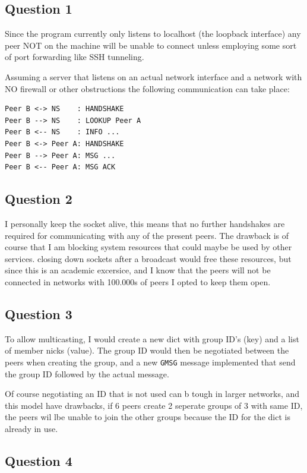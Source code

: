 \documentclass[10pt]{article}
\begin{document}
\subsection{Question 1}
Since the program currently only listens to localhost (the loopback interface)
any peer NOT on the machine will be unable to connect unless employing some sort
of port forwarding like SSH tunneling.

Assuming a server that listens on an actual network interface and a network with
NO firewall or other obstructions the following communication can take place:
\begin{verbatim}
Peer B <-> NS    : HANDSHAKE
Peer B --> NS    : LOOKUP Peer A
Peer B <-- NS    : INFO ...
Peer B <-> Peer A: HANDSHAKE
Peer B --> Peer A: MSG ...
Peer B <-- Peer A: MSG ACK
\end{verbatim}

\subsection{Question 2}
I personally keep the socket alive, this means that no further handshakes are
required for communicating with any of the present peers. The drawback is of
course that I am blocking system resources that could maybe be used by other
services. closing down sockets after a broadcast would free these resources, but
since this is an academic excersice, and I know that the peers will not be
connected in networks with 100.000s of peers I opted to keep them open.

\subsection{Question 3}
To allow multicasting, I would create a new dict with group ID's (key) and a
list of member nicks (value). The group ID would then be negotiated between the
peers when creating the group, and a new \texttt{GMSG} message implemented that
send the group ID followed by the actual message.

Of course negotiating an ID that is not used can b tough in larger networks, and
this model have drawbacks, if 6 peers create 2 seperate groups of 3 with same
ID, the peers wil lbe unable to join the other groups because the ID for the
dict is already in use.

\subsection{Question 4}
\end{document}
